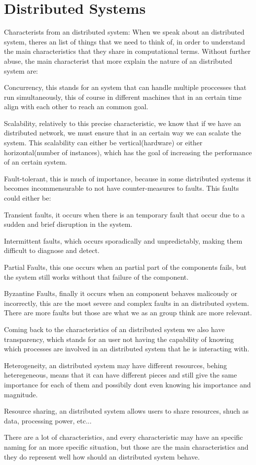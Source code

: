 \section{Distributed Systems}

\quad{} Characterists from an distributed system:
 When we speak about an distributed system, theres an list of things that we need to think of, in order to understand the main characteristics that they share in computational terms. Without further abuse, the main characterist that more explain the nature of an distributed system are:

  Concurrency, this stands for an system that can handle multiple proccesses that run simultaneously, this of course in different machines that in an certain time align with each other to reach an common goal.
  
  Scalability, relatively to this precise characteristic, we know that if we have an distributed network, we must ensure that in an certain way we can scalate the system. This scalability can either be vertical(hardware) or either horizontal(number of instances), which has the goal of increasing the performance of an certain system.
  
  Fault-tolerant, this is much of importance, because in some distributed systems it becomes incommensurable to not have counter-measures to faults. This faults could either be:
  
  Transient faults, it occurs when there is an temporary fault that occur due to a sudden and brief disruption in the system.
  
  Intermittent faults, which occurs sporadically and unpredictably, making them difficult to diagnose and detect.
  
  Partial Faults, this one occurs when an partial part of the components fails, but the system still works without that failure of the component.
  
  Byzantine Faults, finally it occurs when an component behaves malicously or incorrectly, this are the most severe and complex faults in an distributed system.
  There are more faults but those are what we as an group think are more relevant.
  
  Coming back to the characteristics of an distributed system we also have transparency, which stands for an user not having the capability of knowing which processes are involved in an distributed system that he is interacting with.
  
  Heterogeneity, an distributed system may have different resources, behing heteregeneous, means that it can have different pieces and still give the same importance for each of them and possibily dont even knowing his importance and magnitude.
  
  Resource sharing, an distributed system allows users to share resources, shuch as data, processing power, etc...
  
  There are a lot of characteristics, and every characteristic may have an specific naming for an more specific situation, but those are the main characteristics and they do represent well how should an distributed system behave.